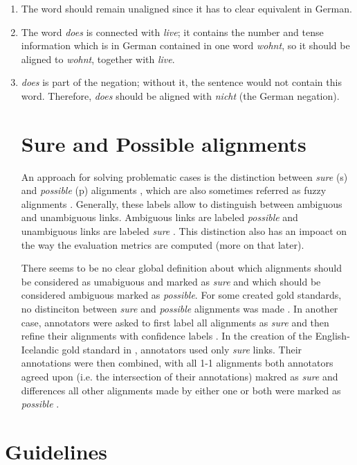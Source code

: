 \begin{enumerate}
	\item The word should remain unaligned since it has to clear equivalent in German.
	\item The word \emph{does} is connected with \emph{live}; it contains the number and tense information which is in German contained in one word \emph{wohnt}, so it should be aligned to \emph{wohnt}, together with \emph{live}.
	\item \emph{does} is part of the negation; without it, the sentence would not contain this word. Therefore, \emph{does} should be aligned with \emph{nicht} (the German negation).

\section{Sure and Possible alignments}
An approach for solving problematic cases is the distinction between \emph{sure} (s) and \emph{possible} (p) alignments \autocite[115]{koehn2009}, which are also sometimes referred as fuzzy alignments \autocite{clematide2018}. 
Generally, these labels allow to distinguish between ambiguous and unambiguous links. Ambiguous links are labeled \emph{possible} and unambiguous links are labeled \emph{sure} \autocite{lambert2005}. This distinction also has an impoact on the way the evaluation metrics are computed (more on that later).

There seems to be no clear global definition about which alignments should be considered as umabiguous and marked as \emph{sure} and which should be considered ambiguous marked as \emph{possible}. 
For some created gold standards, no distinciton between \emph{sure} and \emph{possible} alignments was made \autocite{clematide2018}. 
In another case, annotators were asked to first label all alignments as \emph{sure} and then refine their alignments with confidence labels \autocite{holmqvist-ahrenberg-2011-gold}. 
In the creation of the English-Icelandic gold standard in \cite{steingrimsson-etal-2021-combalign},  annotators used only \emph{sure} links. 
Their annotations were then combined, with all 1-1 alignments both annotators agreed upon (i.e. the intersection of their annotations) makred as \emph{sure} and differences all other alignments made by either one or both were marked as \emph{possible} \autocite{steingrimsson-etal-2021-combalign}. 


\end{enumerate}

\section{Guidelines}